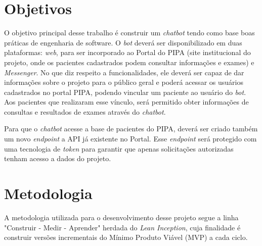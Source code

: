   
  
  
  \section{Objetivos}
  
  O objetivo principal desse trabalho é construir um \textit{chatbot} tendo como base boas práticas de engenharia de software. O \textit{bot} deverá ser disponibilizado em duas plataformas: \textit{web}, para ser incorporado ao Portal do PIPA (site institucional do projeto, onde os pacientes cadastrados podem consultar informações e exames) e \textit{Messenger}. No que diz respeito a funcionalidades, ele deverá ser capaz de dar informações sobre o projeto para o público geral e poderá acessar os usuários cadastrados no portal PIPA, podendo vincular um paciente ao usuário do \textit{bot}. Aos pacientes que realizaram esse vínculo, será permitido obter informações de consultas e resultados de exames através do \textit{chatbot}.
  
  Para que o \emph{chatbot} acesse a base de pacientes do PIPA, deverá ser criado também um novo \emph{endpoint} a API já existente no Portal. Esse \emph{endpoint} será protegido com uma tecnologia de \textit{token} para garantir que apenas solicitações autorizadas tenham acesso a dados do projeto.
  
  
  
  \section{Metodologia}
  A metodologia utilizada para o desenvolvimento desse projeto segue a linha "Construir - Medir - Aprender" herdada do \emph{Lean Inception}, cuja finalidade é construir versões incrementais do Mínimo Produto Viável (MVP) a cada ciclo.
  
